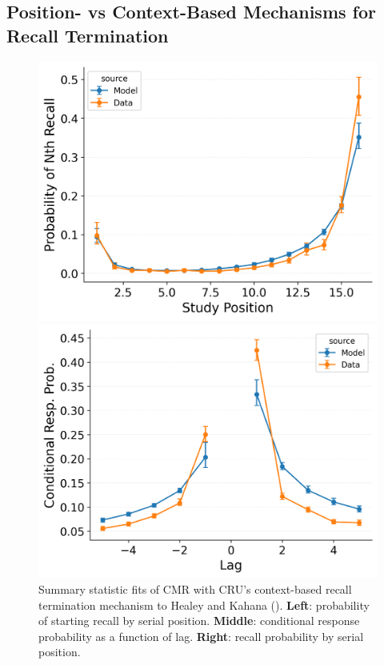 \documentclass[
  man,
  floatsintext,
  longtable,
  nolmodern,
  notxfonts,
  notimes,
  draftfirst,
  colorlinks=true,linkcolor=blue,citecolor=blue,urlcolor=blue]{apa7}
\begin{document}
\subsection{Position- vs Context-Based Mechanisms for Recall
Termination}\label{position--vs-context-based-mechanisms-for-recall-termination}

\begin{figure}

\caption{\label{fig-freetermination}Summary statistic fits of CMR with
CRU's context-based recall termination mechanism to Healey and Kahana
(). \textbf{Left}: probability of
starting recall by serial position. \textbf{Middle}: conditional
response probability as a function of lag. \textbf{Right}: recall
probability by serial position.}

\begin{minipage}{0.33\linewidth}
\includegraphics{figures/HealeyKahana2014_CRU_with_Feature-to-Context__Pre-Expt__Primacy_StartDrift__and_ContextTerm_Fitting_pnr.png}\end{minipage}%
%
\begin{minipage}{0.33\linewidth}
\includegraphics{figures/HealeyKahana2014_CRU_with_Feature-to-Context__Pre-Expt__Primacy_StartDrift__and_ContextTerm_Fitting_crp.png}\end{minipage}%

\end{figure}
\end{document}
